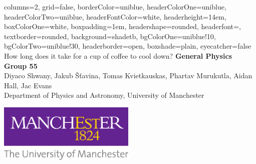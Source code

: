 \documentclass[a0paper,portrait]{baposter}
\begin{document}

\begin{poster}{
  columns=2,
	grid=false,
	borderColor=uniblue,
	headerColorOne=uniblue,
	headerColorTwo=uniblue,
	headerFontColor=white,
  headerheight=14em,
	boxColorOne=white,
  boxpadding=1em,
	headershape=rounded,
	headerfont=\Large\textsf,
	textborder=rounded,
	background=shadetb,
  bgColorOne=uniblue!10,
  bgColorTwo=uniblue!30,
	headerborder=open,
  boxshade=plain,
  eyecatcher=false
}
{ %
}
{\vspace{1.25em} 
\smaller How long does it take for a cup of coffee to cool down?}
{
  \vspace{1.5em}
  {  \textbf{General Physics Group 55} \\
	{\smaller Diyaco Shwany, Jakub \v{S}\v{t}avina, Tomas Kvietkauskas, Phartav Murukutla, Aidan Hall, Jac Evans \\ 
    \textcolor{mcr_purple}{\smaller Department of Physics and Astronomy, University of Manchester}
    }
}
}
{\begin{minipage}{18.0em}
    \includegraphics[height=7.5em]{logo-uni.pdf}
  \end{minipage}}

\end{poster}
\end{document}
